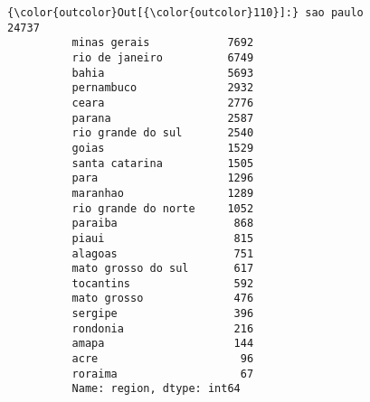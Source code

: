 \documentclass[11pt]{article}
\begin{document}
\begin{Verbatim}[commandchars=\\\{\}]
{\color{outcolor}Out[{\color{outcolor}110}]:} sao paulo              24737
          minas gerais            7692
          rio de janeiro          6749
          bahia                   5693
          pernambuco              2932
          ceara                   2776
          parana                  2587
          rio grande do sul       2540
          goias                   1529
          santa catarina          1505
          para                    1296
          maranhao                1289
          rio grande do norte     1052
          paraiba                  868
          piaui                    815
          alagoas                  751
          mato grosso do sul       617
          tocantins                592
          mato grosso              476
          sergipe                  396
          rondonia                 216
          amapa                    144
          acre                      96
          roraima                   67
          Name: region, dtype: int64
\end{Verbatim}
            
\end{document}
